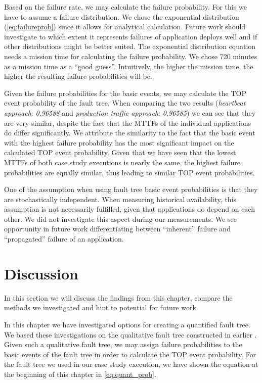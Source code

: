 Based on the failure rate, we may calculate the failure probability. For this we have to assume a failure distribution. We chose the exponential distribution (\autoref{eq:failureprob}) since it allows for analytical calculation. Future work should investigate to which extent it represents failures of application deploys well and if other distributions might be better suited. The exponential distribution equation needs a mission time for calculating the failure probability. We chose 720 minutes as a mission time as a ``good guess''. Intuitively, the higher the mission time, the higher the resulting failure probabilities will be.

Given the failure probabilities for the basic events, we may calculate the TOP event probability of the fault tree. When comparing the two results (\emph{heartbeat approach}: \emph{0,96588} and \emph{production traffic approach}: \emph{0,96585}) we can see that they are very similar, despite the fact that the MTTFs of the individual applications do differ significantly. We attribute the similarity to the fact that the basic event with the highest failure probability has the most significant impact on the calculated TOP event probability. Given that we have seen that the lowest MTTFs of both case study executions is nearly the same, the highest failure probabilities are equally similar, thus leading to similar TOP event probabilities.

One of the assumption when using fault tree basic event probabilities is that they are stochastically independent. When measuring historical availability, this assumption is not necessarily fulfilled, given that applications do depend on each other. We did not investigate this aspect during our measurements. We see opportunity in future work differentiating between ``inherent'' failure and ``propagated'' failure of an application.

\section{Discussion}
\label{sec:quant_discussion}

In this section we will discuss the findings from this chapter, compare the methods we investigated and hint to potential for future work.

In this chapter we have investigated options for creating a quantified fault tree. We based these investigations on the qualitative fault tree constructed in earlier . Given such a qualitative fault tree, we may assign failure probabilities to the basic events of the fault tree in order to calculate the TOP event probability. For the fault tree we used in our case study execution, we have shown the equation at the beginning of this chapter in \autoref{eq:quant_prob}.

